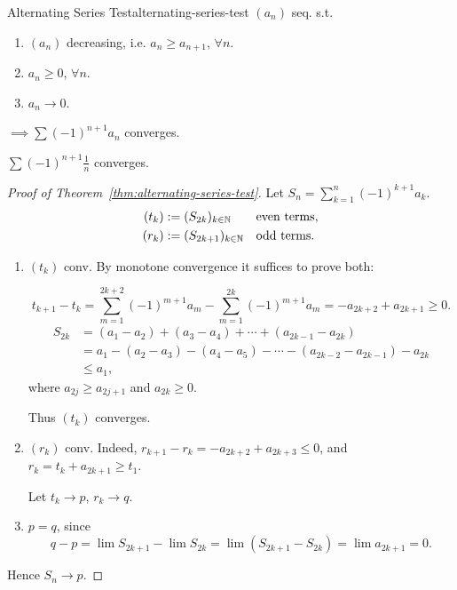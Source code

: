 \begin{theorem}{Alternating Series Test}{alternating-series-test}
  $(a_n)$ seq. s.t.
  \begin{enumerate}[label=(\roman*)]
    \item $(a_n)$ decreasing, i.e. $a_n\ge a_{n+1}$, $\forall n$.
    \item $a_n\ge0$, $\forall n$.
    \item $a_n\to0$.
  \end{enumerate}
  $\implies\sum(-1)^{n+1}a_n$ converges.
\end{theorem}

\begin{example}
  $\displaystyle\sum(-1)^{n+1}\frac1n$ converges.
\end{example}

\begin{proof}[Proof of Theorem~\ref{thm:alternating-series-test}]
  Let $S_n=\sum_{k=1}^n(-1)^{k+1}a_k$.
  \[
    \begin{aligned}
      (t_k) & :=(S_{2k})_{k\in\mathbb{N}}   &  & \text{even terms}, \\
      (r_k) & :=(S_{2k+1})_{k\in\mathbb{N}} &  & \text{odd terms}.
    \end{aligned}
  \]
  \begin{enumerate}[label=\textbf{Step \arabic*.}, proofparts]
    \item $(t_k)$ conv.
          By monotone convergence it suffices to prove both:
          \begin{enumerate}[proofsubgoals]
            \[
              t_{k+1}-t_k=\sum_{m=1}^{2k+2}(-1)^{m+1}a_m
              -\sum_{m=1}^{2k}(-1)^{m+1}a_m
              =-a_{2k+2}+a_{2k+1}\ge0.
            \]
            \[
              \begin{aligned}
                S_{2k}
                 & =(a_1-a_2)+(a_3-a_4)+\cdots+(a_{2k-1}-a_{2k})              \\
                 & =a_1-(a_2-a_3)-(a_4-a_5)-\cdots-(a_{2k-2}-a_{2k-1})-a_{2k} \\
                 & \le a_1,
              \end{aligned}
            \]
            where $a_{2j}\ge a_{2j+1}$ and $a_{2k}\ge0$.
          \end{enumerate}
          Thus $(t_k)$ converges.

    \item $(r_k)$ conv. Indeed, $r_{k+1}-r_k=-a_{2k+2}+a_{2k+3}\le0$,
          and $r_k=t_k+a_{2k+1}\ge t_1$.

          Let $t_k\to p$, $r_k\to q$.

    \item $p=q$, since
          \[
            q-p=\lim S_{2k+1}-\lim S_{2k}
            =\lim(S_{2k+1}-S_{2k})=\lim a_{2k+1}=0.
          \]
  \end{enumerate}
  Hence $S_n\to p$.
\end{proof}
